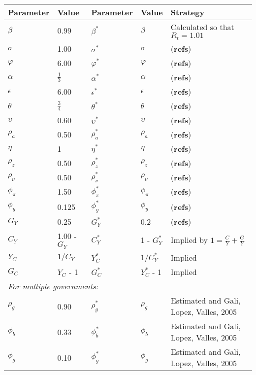\begin{table}[H]
    \centering
    \begin{tabular}{ll|lll}
        Parameter & Value & Parameter & Value & Strategy \\
        \hline
        \hline
        $\beta$ & 0.99 & $\beta^*$ & $\beta$ & Calculated so that $R_t = 1.01$\\
        $\sigma$ & 1.00 & $\sigma^*$ & $\sigma$ & (\textbf{refs})\\
        $\varphi$ & 6.00 & $\varphi^*$ & $\varphi$ & (\textbf{refs})\\
        $\alpha$ & $\frac{1}{3}$ & $\alpha^*$ & $\alpha$ & (\textbf{refs})\\
        $\epsilon$ & 6.00 & $\epsilon^*$ & $\epsilon$ & (\textbf{refs})\\
        $\theta$ & $\frac{3}{4}$ & $\theta^*$ & $\theta$ & (\textbf{refs})\\
        $\upsilon$ & 0.60 & $\upsilon^*$ & $\upsilon$ & (\textbf{refs})\\
        $\rho_a$ & 0.50 & $\rho_a^*$ & $\rho_a$ & (\textbf{refs})\\
        $\eta$ & 1 & $\eta^*$ & $\eta$ & (\textbf{refs})\\
        $\rho_z$ & 0.50 & $\rho_z^*$ & $\rho_z$ & (\textbf{refs})\\
        $\rho_\nu$ & 0.50 & $\rho^*_\nu$ & $\rho_\nu$ & (\textbf{refs})\\
        $\phi_\pi$ & 1.50 & $\phi^*_\pi$ & $\phi_\pi$ & (\textbf{refs})\\
        $\phi_y$ & 0.125 & $\phi^*_y$ & $\phi_y$ & (\textbf{refs})\\
        $G_Y$ & 0.25 & $G_Y^*$ & 0.2 & (\textbf{refs})\\
        $C_Y$ & 1.00 - $G_Y$ & $C_Y^*$ & 1 - $G_Y^*$ & Implied by $1=\frac{C}{Y} + \frac{G}{Y}$\\
        $Y_C$ & $1/{C_Y}$ & $Y_C^*$ & $1/{C_Y^*}$ & Implied \\
        $G_C$ & $Y_C$ - 1 & $G_C^*$ & $Y_C^*$ - 1 & Implied \\
        \multicolumn{5}{l}{\textit{For multiple governments:}} \\
        $\rho_g$ & 0.90 & $\rho_g^*$ & $\rho_g$ & Estimated and Gali, Lopez, Valles, 2005\\
        $\phi_b$ & 0.33 & $\phi_b^*$ & $\phi_b$ & Estimated and Gali, Lopez, Valles, 2005\\
        $\phi_g$ & 0.10 & $\phi_g^*$ & $\phi_g$ & Estimated and Gali, Lopez, Valles, 2005\\

\end{tabular}
\end{table}
